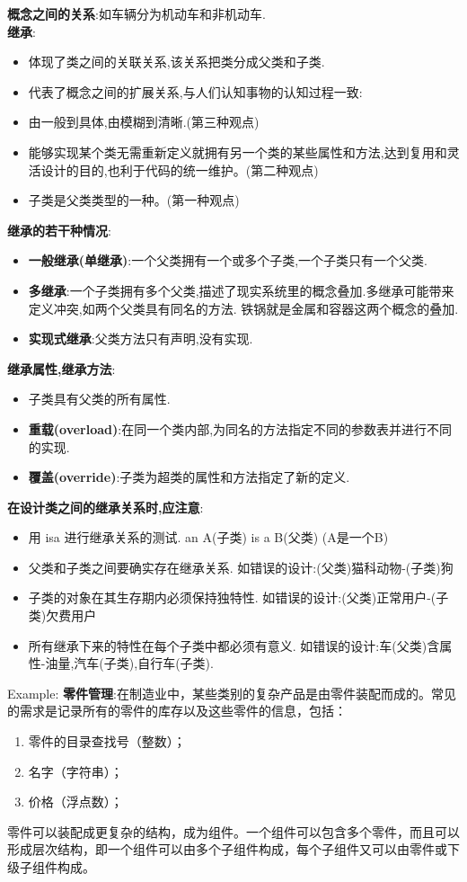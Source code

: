 \documentclass[../main.tex]{subfiles}
\begin{document}
\textbf{概念之间的关系}:如车辆分为机动车和非机动车. \\
\textbf{继承}:
\begin{itemize}
  \item 体现了类之间的关联关系,该关系把类分成父类和子类.
  \item 代表了概念之间的扩展关系,与人们认知事物的认知过程一致:
  \item 由一般到具体,由模糊到清晰.(第三种观点)
  \item 能够实现某个类无需重新定义就拥有另一个类的某些属性和方法,达到复用和灵活设计的目的,也利于代码的统一维护。(第二种观点)
  \item 子类是父类类型的一种。(第一种观点)
\end{itemize}
\textbf{继承的若干种情况}:
\begin{itemize}
  \item \textbf{一般继承(单继承)}:一个父类拥有一个或多个子类,一个子类只有一个父类.
  \item \textbf{多继承}:一个子类拥有多个父类,描述了现实系统里的概念叠加.多继承可能带来定义冲突,如两个父类具有同名的方法.
    铁锅就是金属和容器这两个概念的叠加.
  \item \textbf{实现式继承}:父类方法只有声明,没有实现.
\end{itemize}
\textbf{继承属性,继承方法}:
\begin{itemize}
  \item 子类具有父类的所有属性.
  \item \textbf{重载(overload)}:在同一个类内部,为同名的方法指定不同的参数表并进行不同的实现.
  \item \textbf{覆盖(override)}:子类为超类的属性和方法指定了新的定义.
\end{itemize}
\textbf{在设计类之间的继承关系时,应注意}:
\begin{itemize}
  \item 用 isa 进行继承关系的测试.
    an A(子类) is a B(父类) (A是一个B)
  \item 父类和子类之间要确实存在继承关系.
    如错误的设计:(父类)猫科动物-(子类)狗
  \item 子类的对象在其生存期内必须保持独特性.
    如错误的设计:(父类)正常用户-(子类)欠费用户
  \item 所有继承下来的特性在每个子类中都必须有意义.
    如错误的设计:车(父类)含属性-油量,汽车(子类),自行车(子类).
\end{itemize}
Example: \textbf{零件管理}:在制造业中，某些类别的复杂产品是由零件装配而成的。常见的需求是记录所有的零件的库存以及这些零件的信息，包括：
\begin{enumerate}
  \item 零件的目录查找号（整数）；
  \item 名字（字符串）；
  \item 价格（浮点数）；
\end{enumerate}
零件可以装配成更复杂的结构，成为组件。一个组件可以包含多个零件，而且可以形成层次结构，即一个组件可以由多个子组件构成，每个子组件又可以由零件或下级子组件构成。
\end{document}
